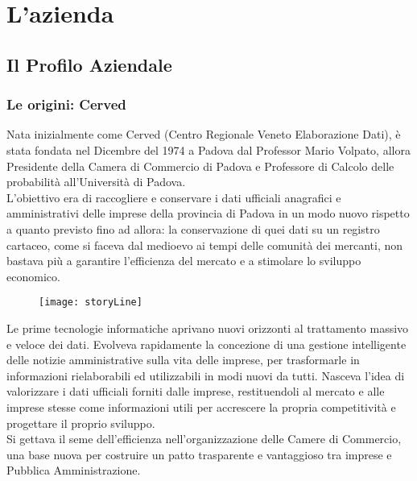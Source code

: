 

\chapter{L'azienda}
\label{cap:azienda}

\section{Il Profilo Aziendale}
\label{sec:il_profilo_aziendale}

	\subsection{Le origini: Cerved}
	Nata inizialmente come Cerved (Centro Regionale Veneto Elaborazione Dati), \nomeAzienda è stata fondata nel Dicembre del 1974 a Padova dal Professor Mario Volpato, allora Presidente della Camera di Commercio di Padova e Professore di Calcolo delle probabilità all'Università di Padova. \\
	L'obiettivo era di raccogliere e conservare i dati ufficiali anagrafici e amministrativi delle imprese della provincia di Padova in un modo nuovo rispetto a quanto previsto fino ad allora: la conservazione di quei dati su un registro cartaceo, come si faceva dal medioevo ai tempi delle comunità dei mercanti, non bastava più a garantire l'efficienza del mercato e a stimolare lo sviluppo economico.
	
	\begin{figure}[htbp]
		\begin{center}
			\texttt{[image: storyLine]}
		\end{center}
	\end{figure}
	
	Le prime tecnologie informatiche aprivano nuovi orizzonti al trattamento massivo e veloce dei dati. Evolveva rapidamente la concezione di una gestione intelligente delle notizie amministrative sulla vita delle imprese, per trasformarle in informazioni rielaborabili ed utilizzabili in modi nuovi da tutti. Nasceva l’idea di valorizzare i dati ufficiali forniti dalle imprese, restituendoli al mercato e alle imprese stesse come informazioni utili per accrescere la propria competitività e progettare il proprio sviluppo.\\
	Si gettava il seme dell’efficienza nell’organizzazione delle Camere di Commercio, una base nuova per costruire un patto trasparente e vantaggioso tra imprese e Pubblica Amministrazione.
	
